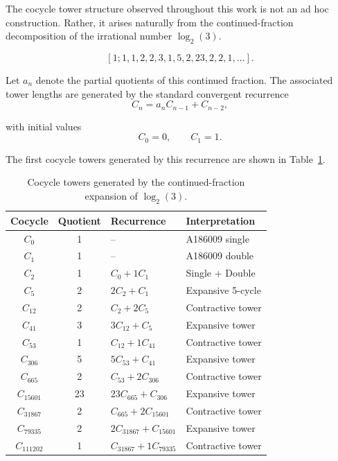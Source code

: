 \documentclass[12pt, oneside]{article}
\numberwithin{equation}{section}
\theoremstyle{definition}
\theoremstyle{plain}
\theoremstyle{remark}
\begin{document}
The cocycle tower structure observed throughout this work is not an ad hoc
construction. Rather, it arises naturally from the continued-fraction
decomposition of the irrational number $\log_2(3)$.

\[
[1;1,1,2,2,3,1,5,2,23,2,2,1,\ldots].
\]

Let $a_n$ denote the partial quotients of this continued fraction.
The associated tower lengths are generated by the standard convergent
recurrence
\[
C_n = a_n C_{n-1} + C_{n-2},
\]

with initial values
\[
C_0 = 0,
\qquad
C_1 = 1.
\]

The first cocycle towers generated by this recurrence are shown in
Table~\ref{tab:cocycle-towers}.
\begin{table}[h]
\centering
\caption{Cocycle towers generated by the continued-fraction expansion of $\log_2(3)$.}
\label{tab:cocycle-towers}
\begin{tabular}{c c l l}
\hline
Cocycle & Quotient & Recurrence & Interpretation \\
\hline

$C_0$       & 1  & -- & A186009 single \\

$C_1$       & 1  & -- & A186009 double \\

$C_2$       & 1  & $C_0 + 1 C_1$ & Single + Double \\

$C_5$       & 2  & $2 C_2 + C_1$ & Expansive 5-cycle \\

$C_{12}$    & 2  & $C_2 + 2 C_5$ & Contractive tower \\

$C_{41}$    & 3  & $3 C_{12} + C_5$ & Expansive tower \\

$C_{53}$    & 1  & $C_{12} + 1 C_{41}$ & Contractive tower \\

$C_{306}$   & 5  & $5C_{53} + C_{41}$ & Expansive tower \\

$C_{665}$   & 2  & $C_{53} + 2 C_{306}$ & Contractive tower \\

$C_{15601}$ & 23 & $23 C_{665} + C_{306}$ & Expansive tower \\

$C_{31867}$ & 2  & $C_{665} + 2 C_{15601}$ & Contractive tower \\

$C_{79335}$ & 2  & $2 C_{31867} + C_{15601}$ & Expansive tower \\

$C_{111202}$ & 1 & $C_{31867} + 1 C_{79335}$ & Contractive tower \\

\hline
\end{tabular}
\end{table}
\end{document}
